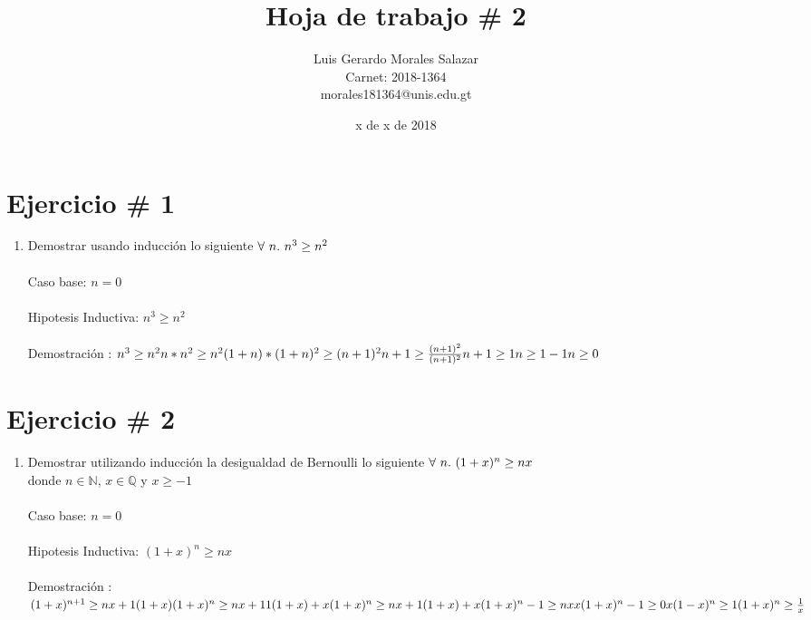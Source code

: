 \documentclass{article}
\title{Hoja de trabajo \# 2}
\author{Luis Gerardo Morales Salazar \\Carnet: 2018-1364\\ morales181364@unis.edu.gt}
\date{x de x de 2018}
\begin{document}
\maketitle
\section{Ejercicio \# 1}

\begin{enumerate}
\item Demostrar usando inducci\'on lo siguiente $\\ \forall\ n.\ n^3\geq n^2$
\\\\Caso base: $n=0 $
\\\\Hipotesis Inductiva: $ n^3\geq n^2\ $ 
\\\\Demostraci\'on :
$\\ n^3\geq n^2\ \\ n*n^2\geq n^2\ \\ (1+n)*(1+n)^2\geq (n+1)^2\ \\ n+1\geq \frac{(n+1)^2}{(n+1)^2}\ \\ n+1\geq 1 \\ n\geq 1-1 \\ n\geq 0 \ $ \end{enumerate}

\section{Ejercicio \# 2}
\begin{enumerate}
\item Demostrar utilizando inducci\'on la desigualdad de Bernoulli lo siguiente $\\ \forall\ n.\ (1+x)^n\geq nx $
\\donde $n\in \mathbb{N}$, $x\in \mathbb{Q}$ y $x\geq -1$
\\\\Caso base: $n=0 $
\\\\Hipotesis Inductiva: $ (1+x)^n\geq nx $ 
\\\\Demostraci\'on :
$\\ (1+x)^{n+1} \geq nx+1\ \\ (1+x)(1+x)^n\geq nx+1\ \\ 1(1+x)+x(1+x)^n\geq nx+1 \\ (1+x)+x(1+x)^n -1\geq nx\ \\ x(1+x)^n -1\geq 0\ \\ x(1-x)^n\geq 1\ \\ (1+x)^n \geq \frac{1}{x} $ 
\end{enumerate}
\end{document}
